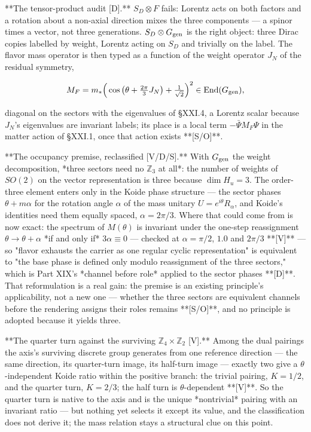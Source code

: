**The tensor-product audit [D].** $S_D\otimes F$ fails: Lorentz acts on both factors and a rotation about a non-axial direction mixes the three components — a spinor times a vector, not three generations. $S_D\otimes G_{\rm gen}$ is the right object: three Dirac copies labelled by weight, Lorentz acting on $S_D$ and trivially on the label. The flavor mass operator is then typed as a function of the weight operator $J_N$ of the residual symmetry,

$$M_F = m_*\Big(\cos\big(\theta+\tfrac{2\pi}{3}J_N\big)+\tfrac1{\sqrt2}\Big)^2\in{\rm End}(G_{\rm gen}),$$

diagonal on the sectors with the eigenvalues of §XXI.4, a Lorentz scalar because $J_N$'s eigenvalues are invariant labels; its place is a local term $-\bar\Psi M_F\Psi$ in the matter action of §XXI.1, once that action exists **[S/O]**.

**The occupancy premise, reclassified [V/D/S].** With $G_{\rm gen}$ the weight decomposition, *three sectors need no $\mathbb Z_3$ at all*: the number of weights of $SO(2)$ on the vector representation is three because $\dim H_u = 3$. The order-three element enters only in the Koide phase structure — the sector phases $\theta+m\alpha$ for the rotation angle $\alpha$ of the mass unitary $U = e^{i\theta}R_\alpha$, and Koide's identities need them equally spaced, $\alpha = 2\pi/3$. Where that could come from is now exact: the spectrum of $M(\theta)$ is invariant under the one-step reassignment $\theta\to\theta+\alpha$ *if and only if* $3\alpha\equiv0$ — checked at $\alpha = \pi/2$, $1.0$ and $2\pi/3$ **[V]** — so "flavor exhausts the carrier as one regular cyclic representation" is equivalent to "the base phase is defined only modulo reassignment of the three sectors," which is Part XIX's *channel before role* applied to the sector phases **[D]**. That reformulation is a real gain: the premise is an existing principle's applicability, not a new one — whether the three sectors are equivalent channels before the rendering assigns their roles remains **[S/O]**, and no principle is adopted because it yields three.

**The quarter turn against the surviving $\mathbb Z_4\times\mathbb Z_2$ [V].** Among the dual pairings the axis's surviving discrete group generates from one reference direction — the same direction, its quarter-turn image, its half-turn image — exactly two give a $\theta$-independent Koide ratio within the positive branch: the trivial pairing, $K = 1/2$, and the quarter turn, $K = 2/3$; the half turn is $\theta$-dependent **[V]**. So the quarter turn is native to the axis and is the unique *nontrivial* pairing with an invariant ratio — but nothing yet selects it except its value, and the classification does not derive it; the mass relation stays a structural clue on this point.


